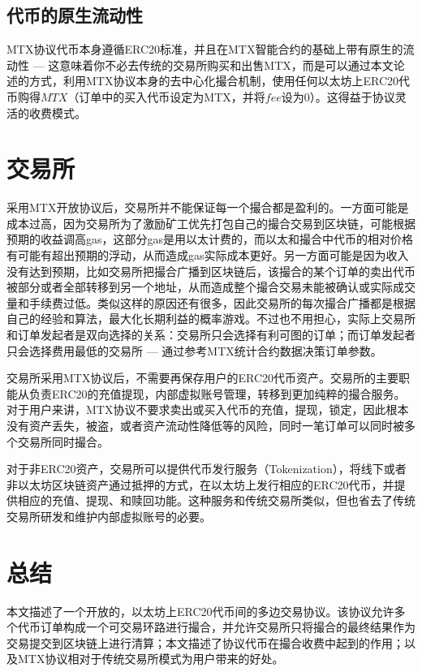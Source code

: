 \documentclass[UTF8,nofonts]{ctexart}
\begin{document}
\subsection{代币的原生流动性}

MTX协议代币本身遵循ERC20标准，并且在MTX智能合约的基础上带有原生的流动性 --- 这意味着你不必去传统的交易所购买和出售MTX，而是可以通过本文论述的方式，利用MTX协议本身的去中心化撮合机制，使用任何以太坊上ERC20代币购得$MTX$（订单中的买入代币设定为MTX，并将$fee$设为0）。这得益于协议灵活的收费模式。

\section{交易所\label{sec:exchange}}

采用MTX开放协议后，交易所并不能保证每一个撮合都是盈利的。一方面可能是成本过高，因为交易所为了激励矿工优先打包自己的撮合交易到区块链，可能根据预期的收益调高gas，这部分gas是用以太计费的，而以太和撮合中代币的相对价格有可能有超出预期的浮动，从而造成gas实际成本更好。另一方面可能是因为收入没有达到预期，比如交易所把撮合广播到区块链后，该撮合的某个订单的卖出代币被部分或者全部转移到另一个地址，从而造成整个撮合交易未能被确认或实际成交量和手续费过低。类似这样的原因还有很多，因此交易所的每次撮合广播都是根据自己的经验和算法，最大化长期利益的概率游戏。不过也不用担心，实际上交易所和订单发起者是双向选择的关系：交易所只会选择有利可图的订单；而订单发起者只会选择费用最低的交易所 --- 通过参考MTX统计合约数据决策订单参数。

交易所采用MTX协议后，不需要再保存用户的ERC20代币资产。交易所的主要职能从负责ERC20的充值提现，内部虚拟账号管理，转移到更加纯粹的撮合服务。对于用户来讲，MTX协议不要求卖出或买入代币的充值，提现，锁定，因此根本没有资产丢失，被盗，或者资产流动性降低等的风险，同时一笔订单可以同时被多个交易所同时撮合。

对于非ERC20资产，交易所可以提供代币发行服务（Tokenization），将线下或者非以太坊区块链资产通过抵押的方式，在以太坊上发行相应的ERC20代币，并提供相应的充值、提现、和赎回功能。这种服务和传统交易所类似，但也省去了传统交易所研发和维护内部虚拟账号的必要。

\section{总结\label{sec:summary}}

本文描述了一个开放的，以太坊上ERC20代币间的多边交易协议。该协议允许多个代币订单构成一个可交易环路进行撮合，并允许交易所只将撮合的最终结果作为交易提交到区块链上进行清算；本文描述了协议代币在撮合收费中起到的作用；以及MTX协议相对于传统交易所模式为用户带来的好处。
\end{document}
